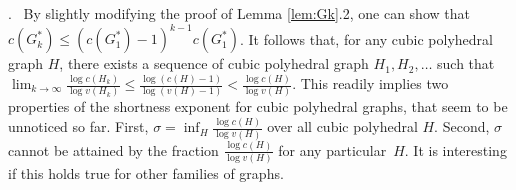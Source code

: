 \documentclass[reqno,12pt]{amsart}
\newcommand{\fix}[1]{\mathit{fix}(#1)}
\newcommand{\hide}[1]{}
\newcounter{oq}
\newcommand{\que}{\refstepcounter{oq}\par{\sc \theoq.}~}
\begin{document}
\hide{
\que
Since grid graphs are almost layered, we have for them $\fix{P_s\times P_s}\ge\sqrt{n/2}$
where $n=s^2$.
How tight is this lower bound?
From \cite[Corollary 4.1]{Cib} we know that $\fix{P_s\times P_s}=O((n\log n)^{2/3})$.
}

\que
By slightly modifying the proof of Lemma \ref{lem:Gk}.2,
one can show that $c(G_k^*)\le(c(G_1^*)-1)^{k-1}c(G_1^*)$.
It follows that, for any cubic polyhedral graph $H$,
there exists a sequence of cubic polyhedral graph $H_1,H_2,\ldots$
such that $\lim_{k\to\infty}\frac{\log c(H_k)}{\log v(H_k)}\le
\frac{\log (c(H)-1)}{\log (v(H)-1)}<\frac{\log c(H)}{\log v(H)}$.
This readily implies two properties of the shortness exponent
for cubic polyhedral graphs, that seem to be unnoticed so far.
First, $\sigma=\inf_H\frac{\log c(H)}{\log v(H)}$ over all
cubic polyhedral $H$. Second, $\sigma$ cannot be attained
by the fraction $\frac{\log c(H)}{\log v(H)}$ for any particular~$H$.
It is interesting if this holds true for other families of graphs.
\end{document}

